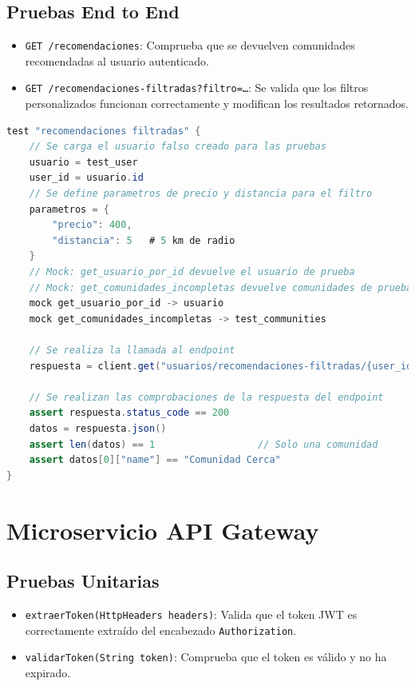 \subsection{Pruebas End to End}
\begin{itemize}
    \item \texttt{GET /recomendaciones}: Comprueba que se devuelven comunidades recomendadas al usuario autenticado.
    \item \texttt{GET /recomendaciones-filtradas?filtro=\dots}: Se valida que los filtros personalizados funcionan correctamente y modifican los resultados retornados.
\end{itemize}


\begin{lstlisting}[language=Java, caption={Pseudocódigo del test recomendacionesFiltradas}]
test "recomendaciones filtradas" {
    // Se carga el usuario falso creado para las pruebas
    usuario = test_user
    user_id = usuario.id
    // Se define parametros de precio y distancia para el filtro
    parametros = {
        "precio": 400,
        "distancia": 5   # 5 km de radio
    }
    // Mock: get_usuario_por_id devuelve el usuario de prueba
    // Mock: get_comunidades_incompletas devuelve comunidades de prueba
    mock get_usuario_por_id -> usuario
    mock get_comunidades_incompletas -> test_communities

    // Se realiza la llamada al endpoint
    respuesta = client.get("usuarios/recomendaciones-filtradas/{user_id}", params=parametros)

    // Se realizan las comprobaciones de la respuesta del endpoint
    assert respuesta.status_code == 200
    datos = respuesta.json()
    assert len(datos) == 1                  // Solo una comunidad
    assert datos[0]["name"] == "Comunidad Cerca"
}
\end{lstlisting}

\section{Microservicio API Gateway}

\subsection{Pruebas Unitarias}
\begin{itemize}
    \item \texttt{extraerToken(HttpHeaders headers)}: Valida que el token JWT es correctamente extraído del encabezado \texttt{Authorization}.
    \item \texttt{validarToken(String token)}: Comprueba que el token es válido y no ha expirado.
\end{itemize}

